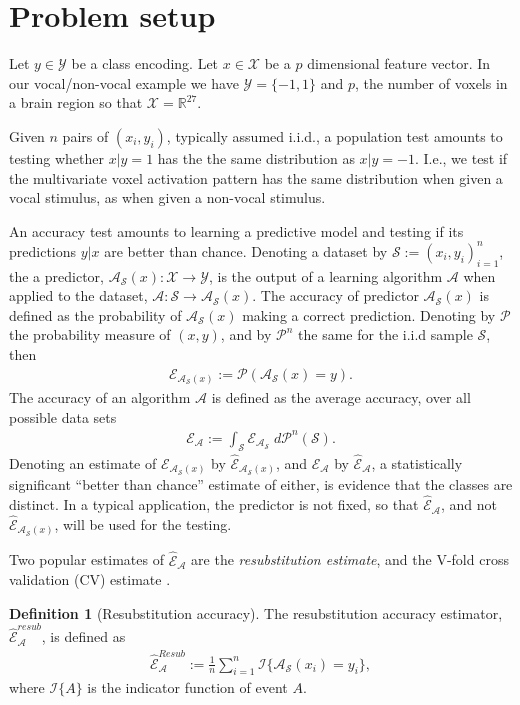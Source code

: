 \documentclass[12pt,a4paper]{article}
\theoremstyle{definition}
\newtheorem{definition}{Definition}
\newcommand{\set}[1]{\{ #1 \}} %
\newcommand{\indicator}[1]{\mathcal{I}{\set{#1}}} %
\newcommand{\reals}{\mathbb{R}} %
\newcommand{\features}{x} %
\newcommand{\outcomes}{y} %
\newcommand{\featureS}{\mathcal{X}} %
\newcommand{\outcomeS}{\mathcal{Y}} %
\newcommand{\acc}{\mathcal{E}}
\newcommand{\accEstim}{\hat{\mathcal{E}}}
\newcommand{\hyp}{\algo_{\data}(\features)} %
\newcommand{\hypFun}[2]{\algo_{#1}(#2)} %
\newcommand{\algo}{\mathcal{A}}
\newcommand{\data}{\mathcal{S}}
\newcommand{\measure}{\mathcal{P}}
\newcommand{\measuren}{\measure^n}
\begin{document}
\section{Problem setup}
\label{sec:problem_setup}

Let $\outcomes \in \outcomeS$ be a class encoding. 
Let $\features \in \featureS$ be a $p$ dimensional feature vector. 
In our vocal/non-vocal example we have $\outcomeS=\set{-1,1}$ and $p$, the number of voxels in a brain region so that $\featureS=\reals^{27}$. 

Given $n$ pairs of $(\features_i,\outcomes_i)$, typically assumed i.i.d., a population test amounts to testing whether $\features|\outcomes=1$ has the the same distribution as $\features|\outcomes=-1$. 
I.e., we test if the multivariate voxel activation pattern has the same distribution when given a vocal stimulus, as when given a non-vocal stimulus. 

An accuracy test amounts to learning a predictive model and testing if its predictions $y|x$ are better than chance. 
Denoting a dataset by $\data:=(\features_i,\outcomes_i)_{i=1}^n$, the a predictor, $\hyp:\featureS \to \outcomeS$, is the output of a learning algorithm $\algo$ when applied to the dataset, $\algo:\data \to \hyp$. 
The accuracy of predictor $\hyp$ is defined as the probability of $\hyp$ making a correct prediction.
Denoting by $\measure$ the probability measure of $(\features, \outcomes)$, and by $\measuren$ the same for the i.i.d sample $\data$, then
\begin{align}
	\acc_{\hyp}:=\measure(\hyp=\outcomes).
\end{align}
The accuracy of an algorithm $\algo$ is defined as the average accuracy, over all possible data sets
\begin{align}
	\acc_{\algo}:=\int_\data \acc_{\algo_\data} \; d\measuren(\data).
\end{align}
Denoting an estimate of $\acc_{\hyp}$ by $\accEstim_{\hyp}$, and $\acc_{\algo}$ by $\accEstim_{\algo}$, 
a statistically significant ``better than chance'' estimate of either,  is evidence that the classes are distinct. 
In a typical application, the predictor is not fixed, so that $\accEstim_{\algo}$, and not $\accEstim_{\hyp}$, will be used for the testing. 

Two popular estimates of $\accEstim_{\algo}$ are the \emph{resubstitution estimate}, and the V-fold cross validation (CV) estimate \citep{hastie_elements_2003}.
\begin{definition}[Resubstitution accuracy]
\label{def:resubstitution}
The resubstitution accuracy estimator, $\accEstim_{\algo}^{resub}$,  is defined as
\begin{align}
	\accEstim_{\algo}^{Resub} := \frac 1n \sum_{i=1}^{n} \indicator{\hypFun{\data}{\features_i}=\outcomes_i}, 
\end{align}
where $\indicator{A}$ is the indicator function of event $A$. 
\end{definition}
\end{document}
